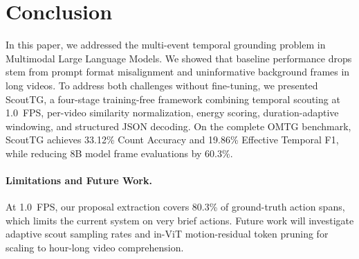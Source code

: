 \section{Conclusion}
\label{sec:conclusion}

In this paper, we addressed the multi-event temporal grounding problem in Multimodal Large Language Models. We showed that baseline performance drops stem from prompt format misalignment and uninformative background frames in long videos. To address both challenges without fine-tuning, we presented ScoutTG, a four-stage training-free framework combining temporal scouting at 1.0~FPS, per-video similarity normalization, energy scoring, duration-adaptive windowing, and structured JSON decoding. On the complete OMTG benchmark, ScoutTG achieves 33.12\% Count Accuracy and 19.86\% Effective Temporal F1, while reducing 8B model frame evaluations by 60.3\%. 

\paragraph{Limitations and Future Work.} At 1.0~FPS, our proposal extraction covers 80.3\% of ground-truth action spans, which limits the current system on very brief actions. Future work will investigate adaptive scout sampling rates and in-ViT motion-residual token pruning for scaling to hour-long video comprehension.
